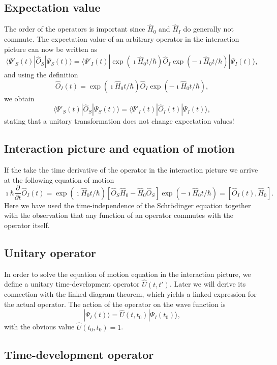 \documentclass[%
oneside,                 %
final,                   %
10pt]{article}
\begin{document}
\subsection{Expectation value}

The order of the operators is important since $\hat{H}_0$ and $\hat{H}_I$ do generally not commute.
The expectation value of
an arbitrary operator in the interaction picture can now be written as
\[
\langle \Psi'_S(t)|\hat{O}_S|\Psi_S(t)\rangle = 
\langle \Psi'_I(t) |\exp{(\imath\hat{H}_0t/\hbar)}\hat{O}_I
\exp{(-\imath\hat{H}_0t/\hbar)}|\Psi_I(t)\rangle,
\]
and using the definition
\[
\hat{O}_I(t)=
\exp{(\imath\hat{H}_0t/\hbar)}\hat{O}_I\exp{(-\imath\hat{H}_0t/\hbar)},
\]
we obtain
\[
\langle \Psi'_S(t)|\hat{O}_S|\Psi_S(t)\rangle = 
\langle \Psi'_I(t) |\hat{O}_I(t)|\Psi_I(t)\rangle,
\]
stating that a unitary transformation does not change expectation values!

\subsection{Interaction picture and equation of motion}

If the take the time derivative of the operator in the interaction picture we arrive at the following equation of motion
\[
\imath \hbar\frac{\partial }{\partial t}\hat{O}_I(t) = \exp{(\imath\hat{H}_0t/\hbar)}\left[\hat{O}_S\hat{H}_0-\hat{H}_0\hat{O}_S\right]\exp{(-\imath\hat{H}_0t/\hbar)}=\left[\hat{O}_I(t),\hat{H}_0\right].
\]
Here we have used the time-independence of the Schrödinger equation
together with the observation that any function of an operator commutes with the operator itself. 

\subsection{Unitary operator}

In order to solve the equation of motion equation in the interaction picture, we define a unitary
time-development operator $\hat{U}(t,t')$. Later we will derive its
connection with the linked-diagram theorem, which yields a
linked expression for the actual operator. 
The action of the operator on the wave function is
\[
|\Psi_I(t) \rangle = \hat{U}(t,t_0)|\Psi_I(t_0)\rangle,
\]
with the obvious value $\hat{U}(t_0,t_0)=1$.

\subsection{Time-development operator}
\end{document}
